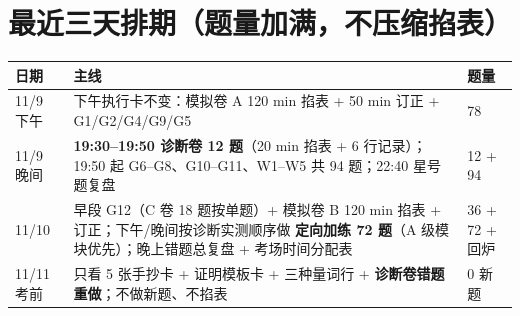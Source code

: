 \documentclass[11pt,a4paper]{ctexart}
\begin{document}
\section{最近三天排期（题量加满，不压缩掐表）}
\begin{center}\small
\begin{tabular}{@{}p{2.1cm}p{10.3cm}p{2.9cm}@{}}
\toprule
\textbf{日期} & \textbf{主线} & \textbf{题量} \\
\midrule
11/9 下午 & 下午执行卡不变：模拟卷 A 120 min 掐表 + 50 min 订正 + G1/G2/G4/G9/G5 & 78 \\
11/9 晚间 & \textbf{19:30--19:50 诊断卷 12 题}（20 min 掐表 + 6 行记录）；19:50 起 G6--G8、G10--G11、W1--W5 共 94 题；22:40 星号题复盘 & 12 + 94 \\
11/10 & 早段 G12（C 卷 18 题按单题）+ 模拟卷 B 120 min 掐表 + 订正；下午/晚间按诊断实测顺序做 \textbf{定向加练 72 题}（A 级模块优先）；晚上错题总复盘 + 考场时间分配表 & 36 + 72 + 回炉 \\
11/11 考前 & 只看 5 张手抄卡 + 证明模板卡 + 三种量词行 + \textbf{诊断卷错题重做}；不做新题、不掐表 & 0 新题 \\
\bottomrule
\end{tabular}
\end{center}
\end{document}
